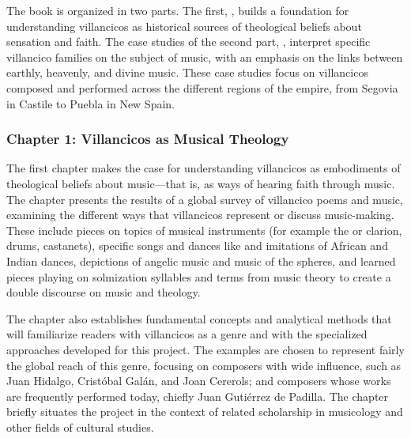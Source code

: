 \documentclass{vcbook-proposal}
\begin{document}
The book is organized in two parts.
The first, , builds a foundation for 
understanding villancicos as historical sources of theological beliefs about 
sensation and faith.
The case studies of the second part, , interpret specific villancico families on the subject of music, with an 
emphasis on the links between earthly, heavenly, and divine music.
These case studies focus on villancicos composed and performed across the
different regions of the empire, from Segovia in Castile to Puebla in New Spain.

\subsubsection{Chapter 1: Villancicos as Musical Theology}

The first chapter makes the case for understanding villancicos as embodiments 
of theological beliefs about music---that is, as ways of hearing faith through 
music.
The chapter presents the results of a global survey of villancico poems and 
music, examining the different ways that villancicos represent or discuss 
music-making.
These include pieces on topics of musical instruments (for example the 
 or clarion, drums, castanets), specific songs and dances like 
 and imitations of African and Indian dances, depictions of 
angelic music and music of the spheres, and learned pieces playing on 
solmization syllables and terms from music theory to create a double discourse 
on music and theology.

The chapter also establishes fundamental concepts and analytical methods that 
will familiarize readers with villancicos as a genre and with the specialized 
approaches developed for this project.
The examples are chosen to represent fairly the global reach of this genre, 
focusing on composers with wide influence, such as Juan Hidalgo, Cristóbal 
Galán, and Joan Cererols; and composers whose works are frequently performed 
today, chiefly Juan Gutiérrez de Padilla.
The chapter briefly situates the project in the context of related scholarship
in musicology and other fields of cultural studies.
\end{document}

